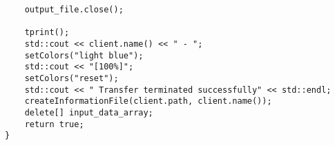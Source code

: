 \begin{lstlisting}
    output_file.close();

    tprint();
    std::cout << client.name() << " - ";
    setColors("light blue");
    std::cout << "[100%]";
    setColors("reset");
    std::cout << " Transfer terminated successfully" << std::endl;
    createInformationFile(client.path, client.name());
    delete[] input_data_array;
    return true;
}
\end{lstlisting}